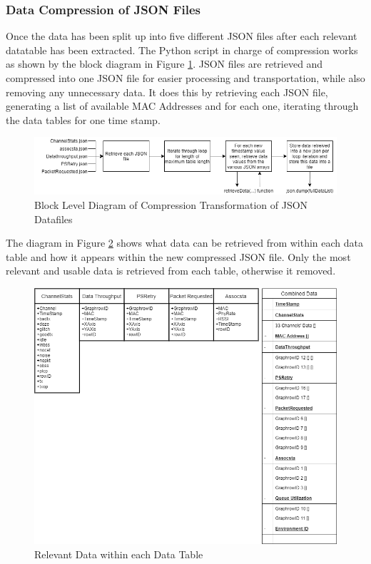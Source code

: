 \subsubsection{Data Compression of JSON Files}
\label{data_compression}
Once the data has been split up into five different JSON files after each relevant datatable has been extracted. The Python script in charge of compression works as shown by the block diagram in Figure \ref{fig:json_compression}. JSON files are retrieved and compressed into one JSON file for easier processing and transportation, while also removing any unnecessary data. It does this by retrieving each JSON file, generating a list of available MAC Addresses and for each one, iterating through the data tables for one time stamp.
\begin{figure}[ht]
    \centering
    \includegraphics[width=1\linewidth]{pages/Chapter4/Chapter 4 Images/json_compression.png}
    \caption{Block Level Diagram of Compression Transformation of JSON Datafiles}
    \label{fig:json_compression}
\end{figure}
The diagram in Figure \ref{fig:data_table_data} shows what data can be retrieved from within each data table and how it appears within the new compressed JSON file. Only the most relevant and usable data is retrieved from each table, otherwise it removed.
\begin{figure}[ht]
    \centering
    \includegraphics[width=1\linewidth]{pages/Chapter4/Chapter 4 Images/router_data-Dataset Contains.png}
    \caption{Relevant Data within each Data Table}
    \label{fig:data_table_data}
\end{figure}


